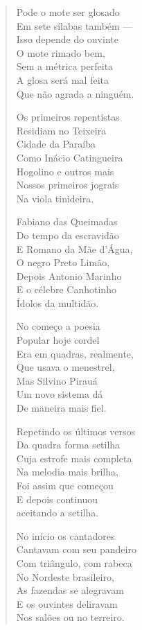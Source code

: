 \begin{verse}
Pode o mote ser glosado \\
Em sete sílabas também ---\\
Isso depende do ouvinte \\
O mote rimado bem, \\
Sem a métrica perfeita \\
A glosa será mal feita \\
Que não agrada a ninguém. 
\pagebreak

Os primeiros repentistas \\
Residiam no Teixeira \\
Cidade da Paraíba \\
Como Inácio Catingueira \\
Hogolino e outros mais \\
Nossos primeiros jograis \\
Na viola tinideira. 

Fabiano das Queimadas \\
Do tempo da escravidão \\
E Romano da Mãe d'Água, \\
O negro Preto Limão, \\
Depois Antonio Marinho \\
E o célebre Canhotinho \\
Ídolos da multidão. 

No começo a poesia \\
Popular hoje cordel \\
Era em quadras, realmente, \\
Que usava o menestrel, \\
Mas Silvino Pirauá \\
Um novo sistema dá \\
De maneira mais fiel. 

Repetindo os últimos versos \\
Da quadra forma setilha \\
Cuja estrofe mais completa \\
Na melodia mais brilha, \\
Foi assim que começou \\
E depois continuou \\
aceitando a setilha. 
\pagebreak

No início os cantadores \\
Cantavam com seu pandeiro \\
Com triângulo, com rabeca \\
No Nordeste brasileiro, \\
As fazendas se alegravam \\
E os ouvintes deliravam \\
Nos salões ou no terreiro. 


\end{verse}
